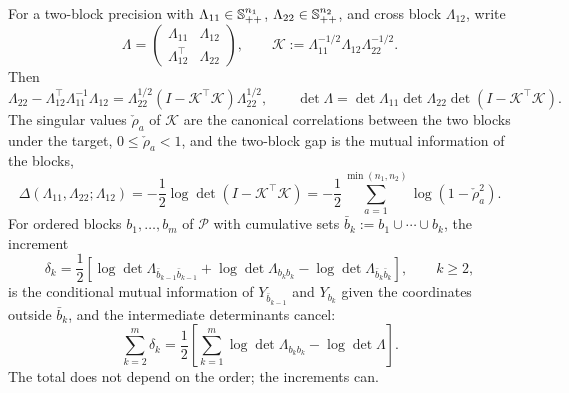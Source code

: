 For a two-block precision with \(\Lambda_{11}\in\mathbb S_{++}^{n_1}\),
\(\Lambda_{22}\in\mathbb S_{++}^{n_2}\), and cross block \(\Lambda_{12}\), write
\begin{equation}
\Lambda=\begin{pmatrix}\Lambda_{11}&\Lambda_{12}\\\Lambda_{12}^\top&\Lambda_{22}\end{pmatrix},
\qquad
\mathcal K:=\Lambda_{11}^{-1/2}\Lambda_{12}\Lambda_{22}^{-1/2}.
\label{eq:restrict-canonical-correlation-factor}
\end{equation}
Then
\begin{equation}
\Lambda_{22}-\Lambda_{12}^\top\Lambda_{11}^{-1}\Lambda_{12}
=\Lambda_{22}^{1/2}\left(I-\mathcal K^\top\mathcal K\right)\Lambda_{22}^{1/2},
\qquad
\det\Lambda=\det\Lambda_{11}\det\Lambda_{22}\det\left(I-\mathcal K^\top\mathcal K\right).
\label{eq:restrict-stable-schur-factor}
\end{equation}
The singular values \(\check\rho_a\) of \(\mathcal K\) are the canonical correlations
between the two blocks under the target, \(0\leq\check\rho_a<1\), and the two-block gap
is the mutual information of the blocks,
\begin{equation}
\Delta(\Lambda_{11},\Lambda_{22};\Lambda_{12})
=-\frac12\log\det\left(I-\mathcal K^\top\mathcal K\right)
=-\frac12\sum_{a=1}^{\min(n_1,n_2)}\log\left(1-\check\rho_a^2\right).
\label{eq:restrict-canonical-correlation-gap}
\end{equation}
For ordered blocks \(b_1,\ldots,b_m\) of \(\mathcal P\) with cumulative sets
\(\bar b_k:=b_1\cup\cdots\cup b_k\), the increment
\begin{equation}
\delta_k
=\frac12\left[
\log\det\Lambda_{\bar b_{k-1}\bar b_{k-1}}
+\log\det\Lambda_{b_kb_k}
-\log\det\Lambda_{\bar b_k\bar b_k}
\right],
\qquad k\geq2,
\label{eq:restrict-cumulative-gap-increment}
\end{equation}
is the conditional mutual information of \(Y_{\bar b_{k-1}}\) and \(Y_{b_k}\)
given the coordinates outside \(\bar b_k\), and the intermediate determinants
cancel:
\begin{equation}
\sum_{k=2}^{m}\delta_k
=\frac12\left[
\sum_{k=1}^{m}\log\det\Lambda_{b_kb_k}-\log\det\Lambda
\right].
\label{eq:restrict-cumulative-gap-telescope}
\end{equation}
The total does not depend on the order; the increments can. 

